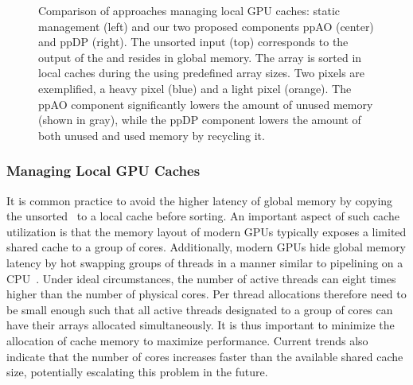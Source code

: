 \documentclass{egpubl}
\newcommand{\stencil}{ppAO}
\newcommand{\dloop}{ppDP}
\begin{document}
\begin{figure}[t]
  \centering
  \def\svgwidth{\textwidth}%
  \graphicspath{{figures/}}%
  {\sffamily\footnotesize}
  \caption{\label{fig:abuffer-local} %
    Comparison of approaches managing local GPU caches: static management (left) and our two proposed components \stencil{} (center) and \dloop{} (right).
    The unsorted input \bFraglist{} (top) corresponds to the output of the \sFill{} and resides in global memory. 
    The array is sorted in local caches during the \sResolve{} using predefined array sizes. 
    Two pixels are exemplified, a heavy pixel (blue) and a light pixel (orange). 
    The \stencil{} component significantly lowers the amount of unused memory (shown in gray), while the \dloop{} component lowers the amount of both unused and used memory by recycling it.
  }
\end{figure}


\subsubsection*{Managing Local GPU Caches}

It is common practice to avoid the higher latency of global memory by copying the unsorted \bFraglist\ to a local cache before sorting.
An important aspect of such cache utilization is that the memory layout of modern GPUs typically exposes a limited shared cache to a group of cores. 
Additionally, modern GPUs hide global memory latency by hot swapping groups of threads in a manner similar to pipelining on a CPU~\cite{Nvidia2011}. 
Under ideal circumstances, the number of active threads can eight times higher than the number of physical cores. 
Per thread allocations therefore need to be small enough such that all active threads designated to a group of cores can have their arrays allocated simultaneously. 
It is thus important to minimize the allocation of cache memory to maximize performance. 
Current trends also indicate that the number of cores increases faster than the available shared cache size, potentially escalating this problem in the future. 
\end{document}
